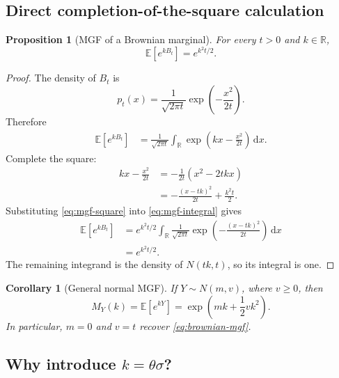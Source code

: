 \documentclass[10pt,a4paper]{article}
\numberwithin{equation}{section}
\theoremstyle{blueplain}
\newtheorem{proposition}[theorem]{Proposition}
\newtheorem{corollary}[theorem]{Corollary}
\theoremstyle{definition}
\newcommand{\E}{\mathbb E}
\newcommand{\R}{\mathbb R}
\newcommand{\dd}{\,\mathrm d}
\begin{document}
\subsection{Direct completion-of-the-square calculation}

\begin{proposition}[MGF of a Brownian marginal]
For every \(t>0\) and \(k\in\R\),
\begin{equation}
  \E[e^{kB_t}]=e^{k^2t/2}.
  \label{eq:brownian-mgf}
\end{equation}
\end{proposition}

\begin{proof}
The density of \(B_t\) is
\[
  p_t(x)=\frac1{\sqrt{2\pi t}}
  \exp\!\left(-\frac{x^2}{2t}\right).
\]
Therefore
\begin{align}
  \E[e^{kB_t}]
  &=\frac1{\sqrt{2\pi t}}
    \int_{\R}\exp\!\left(kx-\frac{x^2}{2t}\right)\dd x.\label{eq:mgf-integral}
\end{align}
Complete the square:
\begin{align}
  kx-\frac{x^2}{2t}
  &=-\frac1{2t}(x^2-2tkx)\\
  &=-\frac{(x-tk)^2}{2t}+\frac{k^2t}{2}.
  \label{eq:mgf-square}
\end{align}
Substituting \eqref{eq:mgf-square} into \eqref{eq:mgf-integral} gives
\begin{align}
  \E[e^{kB_t}]
  &=e^{k^2t/2}
    \int_{\R}\frac1{\sqrt{2\pi t}}
      \exp\!\left(-\frac{(x-tk)^2}{2t}\right)\dd x\\
  &=e^{k^2t/2}.
\end{align}
The remaining integrand is the density of \(N(tk,t)\), so its integral is one.
\end{proof}

\begin{corollary}[General normal MGF]
If \(Y\sim N(m,v)\), where \(v\ge0\), then
\begin{equation}
  M_Y(k)=\E[e^{kY}]=\exp\!\left(mk+\frac12vk^2\right).
  \label{eq:normal-mgf}
\end{equation}
In particular, \(m=0\) and \(v=t\) recover \eqref{eq:brownian-mgf}.
\end{corollary}

\subsection{Why introduce \texorpdfstring{$k=\theta\sigma$}{k = theta sigma}?}
\end{document}
